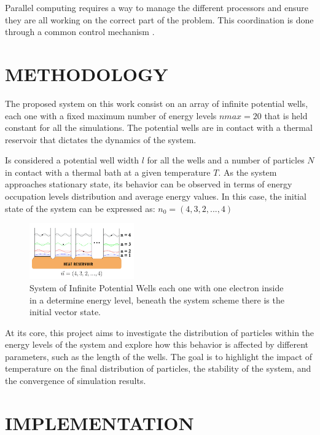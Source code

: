 \documentclass[%
 reprint,
 amsmath,amssymb,
 aps,
]{revtex4-2}
\begin{document}
Parallel computing requires a way to manage the different processors and ensure they are all working on the correct part of the problem. This coordination is done through a common control mechanism \cite{rastogi_significance_nodate} .
\section{METHODOLOGY}

The proposed system on this work consist on an array of infinite potential wells, each one with a fixed maximum number of energy levels $nmax=20$ that is held constant for all the simulations. The potential wells are in contact with a thermal reservoir that dictates the dynamics of the system. \par
Is considered a potential well width $l$ for all the wells and a number of particles $N$ in contact with a thermal bath at a given temperature $T$. As the system approaches stationary state, its behavior can be observed in terms of energy occupation levels distribution and average energy values.
In this case, the initial state of the system can be expressed as: 
$n_0 = (4, 3, 2, ..., 4)$
 \par
\begin{figure}[h]
    \centering
    \includegraphics[width=0.4\textwidth]{reservoir.png} %
    \caption{System of Infinite Potential Wells each one with one electron inside in a determine energy level, beneath the system scheme there is the initial vector state. }
    \label{fig:example}
\end{figure}

At its core, this project aims to investigate the distribution of particles within the energy levels of the system and explore how this behavior is affected by different parameters, such as the length of the wells. The goal is to highlight the impact of temperature on the final distribution of particles, the stability of the system, and the convergence of simulation results.


\section{IMPLEMENTATION}
\end{document}

